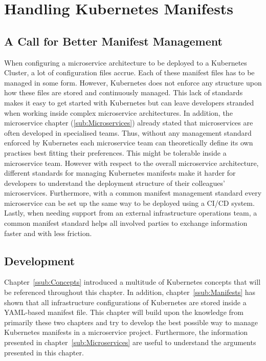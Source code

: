 
\section{Handling Kubernetes Manifests}%
\label{sec:Handling_Kubernetes_Manifests}

\subsection{A Call for Better Manifest Management}%
\label{sub:A_Call_for_Better_Manifest_Management}
When configuring a microservice architecture to be deployed to a Kubernetes
Cluster, a lot of configuration files accrue. Each of these manifest files has
to be managed in some form. However, Kubernetes does not enforce any structure
upon how these files are stored and continuously managed. This lack of
standards makes it easy to get started with Kubernetes but can leave developers
stranded when working inside complex microservice architectures. In addition,
the microservice chapter (\ref{sub:Microservices}) already stated that
microservices are often developed in specialised teams. Thus, without any
management standard enforced by Kubernetes each microservice team can
theoretically define its own practises best fitting their preferences. This
might be tolerable inside a microservice team. However with respect to the
overall microservice architecture, different standards for managing Kubernetes
manifests make it harder for developers to understand the deployment structure
of their colleagues' microservices. Furthermore, with a common manifest
management standard every microservice can be set up the same way to be
deployed using a \ac{CI}/\ac{CD} system. Lastly, when needing support from an
external infrastructure operations team, a common manifest standard helps all
involved parties to exchange information faster and with less friction.

\subsection{Development}%
\label{sub:Development}
Chapter~\ref{ssub:Concepts} introduced a multitude of Kubernetes concepts that
will be referenced throughout this chapter. In addition,
chapter~\ref{ssub:Manifests} has shown that all infrastructure configurations of
Kubernetes are stored inside a YAML-based manifest file. This chapter will
build upon the knowledge from primarily these two chapters and try to develop
the best possible way to manage Kubernetes manifests in a microservice project.
Furthermore, the information presented in chapter~\ref{sub:Microservices} are
useful to understand the arguments presented in this chapter.

